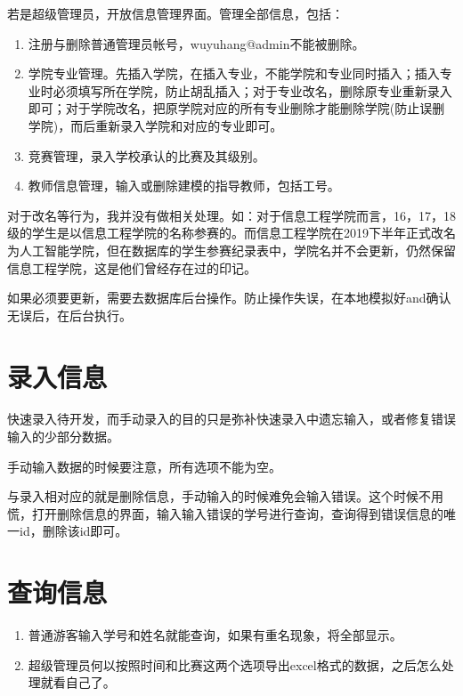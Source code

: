 \documentclass[lang=cn,hazy,screen,blue,14pt]{elegantnote}
\begin{document}
若是超级管理员，开放信息管理界面。管理全部信息，包括：

\begin{enumerate}
\item 注册与删除普通管理员帐号，wuyuhang@admin不能被删除。
\item 学院专业管理。先插入学院，在插入专业，不能学院和专业同时插入；插入专业时必须填写所在学院，防止胡乱插入；对于专业改名，删除原专业重新录入即可；对于学院改名，把原学院对应的所有专业删除才能删除学院(防止误删学院)，而后重新录入学院和对应的专业即可。
\item 竞赛管理，录入学校承认的比赛及其级别。
\item 教师信息管理，输入或删除建模的指导教师，包括工号。
\end{enumerate}

\begin{note}
对于改名等行为，我并没有做相关处理。如：对于信息工程学院而言，16，17，18级的学生是以信息工程学院的名称参赛的。而信息工程学院在2019下半年正式改名为人工智能学院，但在数据库的学生参赛纪录表中，学院名并不会更新，仍然保留信息工程学院，这是他们曾经存在过的印记。
\end{note}

\begin{note}
如果必须要更新，需要去数据库后台操作。防止操作失误，在本地模拟好and确认无误后，在后台执行。
\end{note}

\section{录入信息}

快速录入待开发，而手动录入的目的只是弥补快速录入中遗忘输入，或者修复错误输入的少部分数据。

手动输入数据的时候要注意，所有选项不能为空。

与录入相对应的就是删除信息，手动输入的时候难免会输入错误。这个时候不用慌，打开删除信息的界面，输入输入错误的学号进行查询，查询得到错误信息的唯一id，删除该id即可。

\section{查询信息}

\begin{enumerate}
    \item 普通游客输入学号和姓名就能查询，如果有重名现象，将全部显示。
    \item 超级管理员何以按照时间和比赛这两个选项导出excel格式的数据，之后怎么处理就看自己了。
\end{enumerate}
\end{document}
